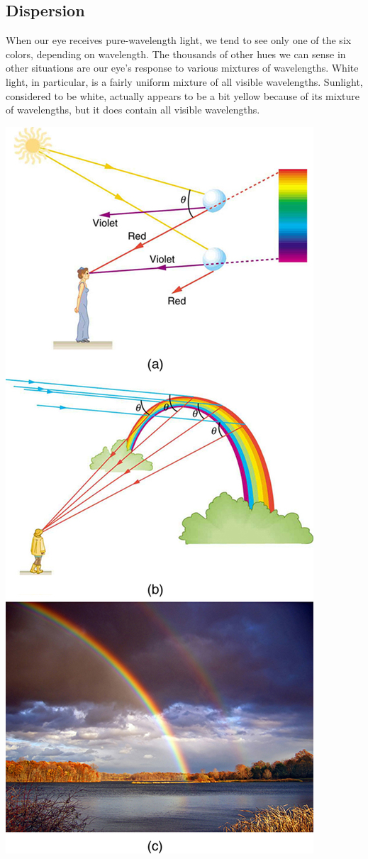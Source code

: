 \documentclass[11pt]{article}
\begin{document}
	\subsection*{Dispersion}
	 When our eye receives pure-wavelength light, we tend to see only one of the six colors, depending on wavelength. The thousands of other hues we can sense in other situations are our eye’s response to various mixtures of wavelengths. White light, in particular, is a fairly uniform mixture of all visible wavelengths. Sunlight, considered to be white, actually appears to be a bit yellow because of its mixture of wavelengths, but it does contain all visible wavelengths.
	 \begin{center}
	 	\includegraphics[scale=0.5]{Dispersion}
	 \end{center}
\end{document}
